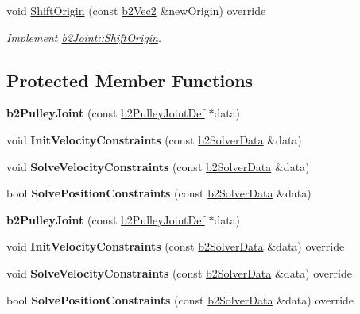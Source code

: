 \begin{DoxyCompactItemize}
\mbox{\label{classb2PulleyJoint_a5a9e626c758380fe565837bedb3dc018}} 
void \hyperlink{classb2PulleyJoint_a5a9e626c758380fe565837bedb3dc018}{Shift\+Origin} (const \hyperlink{structb2Vec2}{b2\+Vec2} \&new\+Origin) override
\begin{DoxyCompactList}\small\item\em Implement \hyperlink{classb2Joint_a7804f649e993dc0fd9ae47fde5601f90}{b2\+Joint\+::\+Shift\+Origin}. \end{DoxyCompactList}\end{DoxyCompactItemize}
\subsection*{Protected Member Functions}
\begin{DoxyCompactItemize}
\item 
\mbox{\label{classb2PulleyJoint_aca1b8dc6fb05c134ccbc0423674c1867}} 
{\bfseries b2\+Pulley\+Joint} (const \hyperlink{structb2PulleyJointDef}{b2\+Pulley\+Joint\+Def} $\ast$data)
\item 
\mbox{\label{classb2PulleyJoint_a1b339ba58e82261beeb55f9ab04cfa7e}} 
void {\bfseries Init\+Velocity\+Constraints} (const \hyperlink{structb2SolverData}{b2\+Solver\+Data} \&data)
\item 
\mbox{\label{classb2PulleyJoint_a517858e93e24f3daa51be4873b22c2c3}} 
void {\bfseries Solve\+Velocity\+Constraints} (const \hyperlink{structb2SolverData}{b2\+Solver\+Data} \&data)
\item 
\mbox{\label{classb2PulleyJoint_a8fcdd728e02b7c89372bf11b7732d976}} 
bool {\bfseries Solve\+Position\+Constraints} (const \hyperlink{structb2SolverData}{b2\+Solver\+Data} \&data)
\item 
\mbox{\label{classb2PulleyJoint_aca1b8dc6fb05c134ccbc0423674c1867}} 
{\bfseries b2\+Pulley\+Joint} (const \hyperlink{structb2PulleyJointDef}{b2\+Pulley\+Joint\+Def} $\ast$data)
\item 
\mbox{\label{classb2PulleyJoint_a1826611f1dfe6284c3ce3afdab875e94}} 
void {\bfseries Init\+Velocity\+Constraints} (const \hyperlink{structb2SolverData}{b2\+Solver\+Data} \&data) override
\item 
\mbox{\label{classb2PulleyJoint_a80de874e392a8238fd2e965f5080222b}} 
void {\bfseries Solve\+Velocity\+Constraints} (const \hyperlink{structb2SolverData}{b2\+Solver\+Data} \&data) override
\item 
\mbox{\label{classb2PulleyJoint_ac3d5f78f3bdd248ca368add8f21b7e95}} 
bool {\bfseries Solve\+Position\+Constraints} (const \hyperlink{structb2SolverData}{b2\+Solver\+Data} \&data) override
\end{DoxyCompactItemize}
